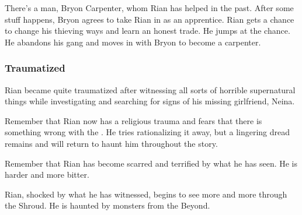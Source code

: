 There's a man, Bryon Carpenter, whom Rian has helped in the past. 
After some stuff happens, Bryon agrees to take Rian in as an apprentice. 
Rian gets a chance to change his thieving ways and learn an honest trade. 
He jumps at the chance. 
He abandons his gang and moves in with Bryon to become a carpenter. 





\subsubsection{Traumatized}
Rian became quite traumatized after witnessing all sorts of horrible supernatural things while investigating \Malcur and searching for signs of his missing girlfriend, Neina. 

Remember that Rian now has a religious trauma and fears that there is something wrong with the \sephiroth. 
He tries rationalizing it away, but a lingering dread remains and will return to haunt him throughout the story. 


Remember that Rian has become scarred and terrified by what he has seen. 
He is harder and more bitter. 

Rian, shocked by what he has witnessed, begins to see more and more through the Shroud. 
He is haunted by monsters from the Beyond. 


